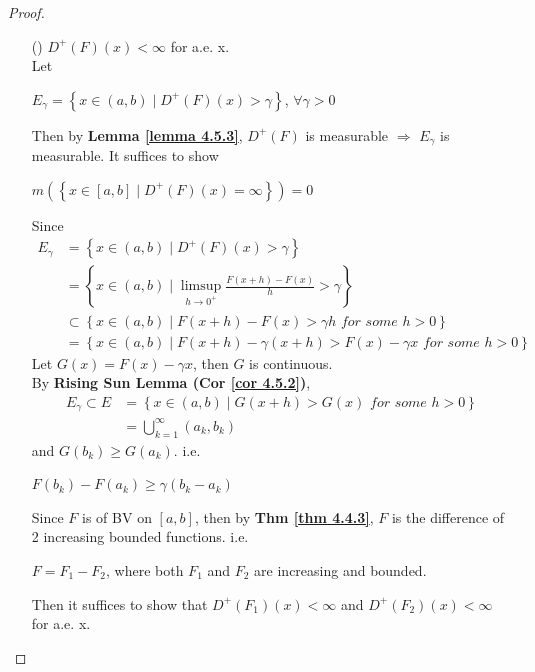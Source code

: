 \begin{thm}
		\newpage
		\begin{proof}
			\begin{enumerate}
				\item[(\rmnum{1})]$D^{+}(F)(x) < \infty$ for a.e. x. \\
				Let 
				\begin{center}
					$E_\gamma = \left\{ x  \in (a , b) \mid D^{+}(F)(x) > \gamma \right\}$, $\forall \gamma > 0$
				\end{center}
				Then by \textbf{Lemma \ref{lemma 4.5.3}}, $D^{+}(F)$ is measurable $\Rightarrow$ $E_\gamma$ is measurable. It suffices to show
				\begin{center}
					$m\left( \left\{ x \in [a , b] \mid D^{+}(F)(x) = \infty \right\} \right) = 0$
				\end{center}
				Since
				\begin{align}
					E_\gamma 
					&= \left\{ x  \in (a , b) \mid D^{+}(F)(x) > \gamma \right\} \\
					&= \left\{ x \in (a , b) \mid \limsup_{h \to 0^{+}}{\frac{F(x + h) - F(x)}{h}} > \gamma \right\} \\
					&\subset \left\{ x \in (a , b) \mid F(x + h) - F(x) > \gamma h \,\, for \,\, some \,\, h > 0 \right\} \\
					&= \left\{ x \in (a , b) \mid F(x + h) - \gamma(x + h) > F(x) - \gamma x \,\, for \,\, some \,\, h > 0 \right\}
				\end{align}
				Let $G(x) = F(x) - \gamma x$, then $G$ is continuous. \\
				By \textbf{Rising Sun Lemma (Cor \ref{cor 4.5.2})},
				\begin{align}
					E_\gamma \subset E &= \left\{ x \in (a , b) \mid G(x + h) > G(x) \,\, for \,\, some \,\, h > 0 \right\} \\
					&= \bigcup_{k = 1}^{\infty}{(a_k , b_k)}
				\end{align}
				and $G(b_k) \geq G(a_k)$. i.e.
				\begin{center}
					$F(b_k) - F(a_k) \geq \gamma(b_k - a_k)$
				\end{center}
				Since $F$ is of BV on $[a , b]$, then by \textbf{Thm \ref{thm 4.4.3}}, $F$ is the difference of 2 increasing bounded functions. i.e.
				\begin{center}
					$F = F_1 - F_2$, where both $F_1$ and $F_2$ are increasing and bounded.
				\end{center}
				Then it suffices to show that $D^{+}(F_1)(x) < \infty$ and $D^{+}(F_2)(x) < \infty$ for a.e. x. \\

\end{enumerate}
\end{proof}
\end{thm}
